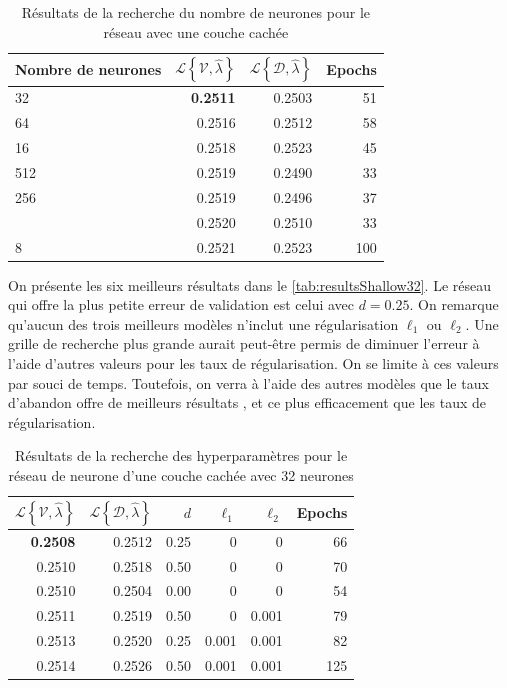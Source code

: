 \begin{table}
\centering
\caption{\label{tab:resultsShallow} Résultats de la recherche du nombre de neurones pour le réseau avec une couche cachée}
\begin{tabularx}{0.6\textwidth}{Xrrr}
\toprule
Nombre \newline de neurones & $\mathcal{L}\left\{\mathcal{V},\hat{\lambda} \right\} $ & $\mathcal{L}\left\{\mathcal{D},\hat{\lambda} \right\} $ &  Epochs\\
\midrule
32 & \textbf{0.2511} & 0.2503 & 51\\
64 & 0.2516 & 0.2512 & 58\\
16 & 0.2518 & 0.2523 & 45\\
512 & 0.2519 & 0.2490 & 33\\
256 & 0.2519 & 0.2496 & 37\\
\addlinespace
128 & 0.2520 & 0.2510 & 33\\
8 & 0.2521 & 0.2523 & 100\\
\bottomrule
\end{tabularx}
\end{table}


On présente les six meilleurs résultats dans le \autoref{tab:resultsShallow32}. Le réseau qui offre la plus petite erreur de validation est celui avec $d=0.25$. On remarque qu'aucun des trois meilleurs modèles n'inclut une régularisation $\ell_1$ ou $\ell_2$. Une grille de recherche plus grande aurait peut-être permis de diminuer l'erreur à l'aide d'autres valeurs pour les taux de régularisation. On se limite à ces valeurs par souci de temps. Toutefois, on verra à l'aide des autres modèles que le taux d'abandon offre de meilleurs résultats , et ce  plus efficacement que les taux de régularisation.


\begin{table}
\centering
\caption[Résultats du réseau d'une couche cachée avec 32 neurones]{\label{tab:resultsShallow32} Résultats de la recherche des hyperparamètres pour le réseau de neurone d'une couche cachée avec 32 neurones}
\begin{tabular}{rrrrrr}
\toprule
$\mathcal{L}\left\{\mathcal{V},\hat{\lambda} \right\} $ & $\mathcal{L}\left\{\mathcal{D},\hat{\lambda} \right\} $ & $d$ & $\ell_1$ & $\ell_2$ & Epochs\\
\midrule
\textbf{0.2508} & 0.2512 & 0.25 & 0 & 0 & 66\\
0.2510 & 0.2518 & 0.50 & 0 & 0 & 70\\
0.2510 & 0.2504 & 0.00 & 0 & 0 & 54\\
0.2511 & 0.2519 & 0.50 & 0 & 0.001 & 79\\
0.2513 & 0.2520 & 0.25 & 0.001 & 0.001 & 82\\
0.2514 & 0.2526 & 0.50 & 0.001 & 0.001 & 125\\
\bottomrule
\end{tabular}
\end{table}

